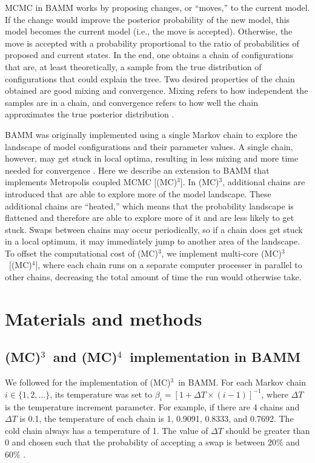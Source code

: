 \documentclass[12pt]{article}
\newcommand{\MCMCMC}{(MC)$^{3}$}
\newcommand{\MCMCMCMC}{(MC)$^{4}$}
\begin{document}
MCMC in BAMM works by proposing changes, or ``moves,'' to the current model.
%
If the change would improve the posterior probability of the new model,
this model becomes the current model (i.e., the move is accepted).
%
Otherwise, the move is accepted with a probability proportional
to the ratio of probabilities of proposed and current states.
%
In the end, one obtains a chain of configurations that are,
at least theoretically, a sample from the true distribution
of configurations that could explain the tree.
%
Two desired properties of the chain obtained are good mixing and convergence.
%
Mixing refers to how independent the samples are in a chain,
and convergence refers to how well the chain
approximates the true posterior distribution \citep{giv05}.


BAMM was originally implemented using a single Markov chain
to explore the landscape of model configurations and their parameter values.
%
A single chain, however, may get stuck in local optima,
resulting in less mixing and more time needed for convergence \citep{alt04}.
%
Here we describe an extension to BAMM
that implements Metropolis coupled MCMC [\MCMCMC].
%
In \MCMCMC, additional chains are introduced
that are able to explore more of the model landscape.
%
These additional chains are ``heated,''
which means that the probability landscape is flattened
and therefore are able to explore more of it
and are less likely to get stuck.
%
Swaps between chains may occur periodically,
so if a chain does get stuck in a local optimum,
it may immediately jump to another area of the landscape.
%
To offset the computational cost of \MCMCMC, we implement
multi-core \MCMCMC\ [\MCMCMCMC], where each chain
runs on a separate computer processer in parallel to other chains,
decreasing the total amount of time the run would otherwise take.


\section*{Materials and methods}

\subsection*{\MCMCMC\ and \MCMCMCMC\ implementation in BAMM}

We followed \citet{alt04} for the implementation of \MCMCMC\ in BAMM.
%
For each Markov chain $i \in \{1, 2, \dots\}$, its temperature was set to
$\beta_i = [1 + \Delta T \times (i - 1)]^{-1}$,
where $\Delta T$ is the temperature increment parameter.
%
For example, if there are 4 chains and $\Delta T$ is 0.1,
the temperature of each chain is 1, 0.9091, 0.8333, and 0.7692.
%
The cold chain always has a temperature of 1.
%
The value of $\Delta T$ should be greater than 0
and chosen such that the probability of accepting a swap
is between 20\% and 60\% \citep{alt04}.
\end{document}

